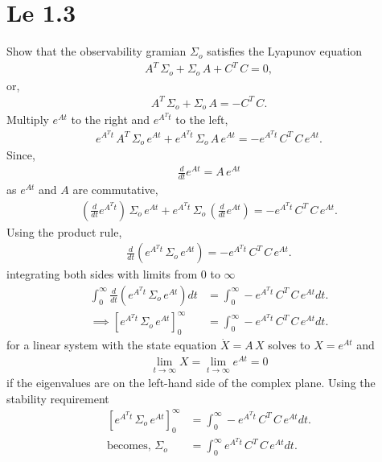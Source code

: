 \section{Le 1.3}
Show that the observability gramian $\Sigma_o$ satisfies the Lyapunov equation
\begin{align*}
    A^T\,\Sigma_o + \Sigma_o\,A + C^T\,C = 0,
\end{align*}
or, 
\begin{align*}
    A^T\,\Sigma_o + \Sigma_o\,A = - C^T\,C.
\end{align*}
Multiply $e^{At}$ to the right and $e^{A^Tt}$ to the left,
\begin{align*}
    e^{A^Tt}\,A^T\,\Sigma_o\,e^{At} + e^{A^Tt}\,\Sigma_o\,A\,e^{At} = -e^{A^Tt}\,C^T\,C\,e^{At}.
\end{align*}
Since, 
\begin{align*}
    \frac{d}{dt}e^{At} = A\,e^{At}
\end{align*}
as $e^{At}$ and $A$ are commutative, 
\begin{align*}
    \left(\frac{d}{dt}e^{A^Tt}\right)\,\Sigma_o\,e^{At} + e^{A^Tt}\,\Sigma_o\,\left(\frac{d}{dt}e^{At}\right) = -e^{A^Tt}\,C^T\,C\,e^{At}.
\end{align*}
Using the product rule, 
\begin{align*}
    \frac{d}{dt}\left(e^{A^Tt}\,\Sigma_o\,e^{At}\right) = -e^{A^Tt}\,C^T\,C\,e^{At}.
\end{align*}
integrating both sides with limits from 0 to $\infty$
\begin{align*}
    \int_0^\infty\frac{d}{dt}\left(e^{A^Tt}\,\Sigma_o\,e^{At}\right) dt &= \int_0^\infty-e^{A^Tt}\,C^T\,C\,e^{At} dt.\\
    \implies \left[e^{A^Tt}\,\Sigma_o\,e^{At}\right]_0^\infty &= \int_0^\infty-e^{A^Tt}\,C^T\,C\,e^{At} dt.
\end{align*}
for a linear system with the state equation $\dot X = A\,X$ solves to $X = e^{At}$ and 
\begin{align*}
    \lim_{t\to\infty}X = \lim_{t\to\infty}e^{At} = 0
\end{align*}
if the eigenvalues are on the left-hand side of the complex plane.
Using the stability requirement
\begin{align*}
    \left[e^{A^Tt}\,\Sigma_o\,e^{At}\right]_0^\infty &= \int_0^\infty-e^{A^Tt}\,C^T\,C\,e^{At} dt.\\
    \text{becomes, } \Sigma_o &= \int_0^\infty e^{A^Tt}\,C^T\,C\,e^{At} dt.
\end{align*}
